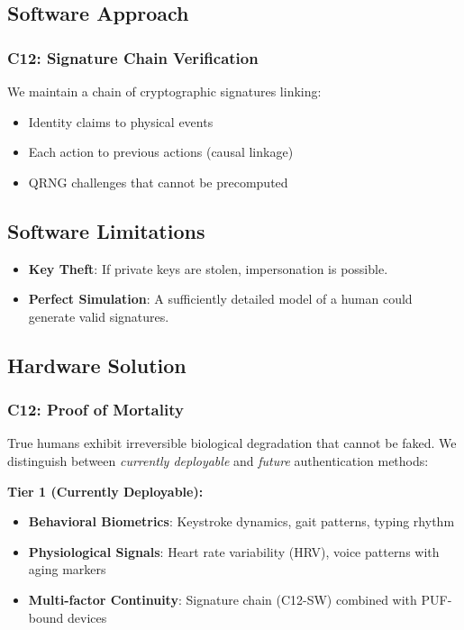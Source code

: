 \documentclass[11pt,a4paper]{article}
\begin{document}
\subsection{Software Approach}

\subsubsection{C12: Signature Chain Verification}

We maintain a chain of cryptographic signatures linking:
\begin{itemize}
    \item Identity claims to physical events
    \item Each action to previous actions (causal linkage)
    \item QRNG challenges that cannot be precomputed
\end{itemize}

\subsection{Software Limitations}

\begin{itemize}
    \item \textbf{Key Theft}: If private keys are stolen, impersonation is possible.
    \item \textbf{Perfect Simulation}: A sufficiently detailed model of a human could generate valid signatures.
\end{itemize}

\subsection{Hardware Solution}

\subsubsection{C12: Proof of Mortality}

True humans exhibit irreversible biological degradation that cannot be faked.
We distinguish between \emph{currently deployable} and \emph{future} authentication methods:

\textbf{Tier 1 (Currently Deployable):}
\begin{itemize}
    \item \textbf{Behavioral Biometrics}: Keystroke dynamics, gait patterns, typing rhythm
    \item \textbf{Physiological Signals}: Heart rate variability (HRV), voice patterns with aging markers
    \item \textbf{Multi-factor Continuity}: Signature chain (C12-SW) combined with PUF-bound devices
\end{itemize}
\end{document}
